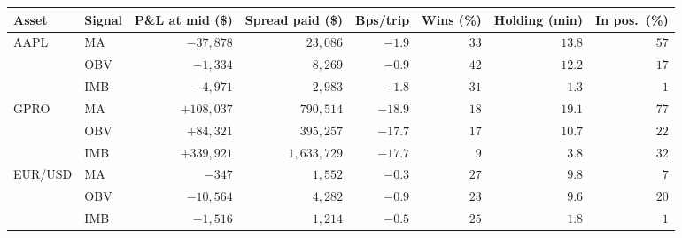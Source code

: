 \begin{tabular}{llrrrrrr}
\toprule
Asset & Signal & P\&L at mid (\$) & Spread paid (\$) & Bps/trip & Wins (\%) & Holding (min) & In pos.\ (\%) \\
\midrule
AAPL & MA & $-37{,}878$ & $23{,}086$ & $-1.9$ & $33$ & $13.8$ & $57$ \\
 & OBV & $-1{,}334$ & $8{,}269$ & $-0.9$ & $42$ & $12.2$ & $17$ \\
 & IMB & $-4{,}971$ & $2{,}983$ & $-1.8$ & $31$ & $1.3$ & $1$ \\
\midrule
GPRO & MA & $+108{,}037$ & $790{,}514$ & $-18.9$ & $18$ & $19.1$ & $77$ \\
 & OBV & $+84{,}321$ & $395{,}257$ & $-17.7$ & $17$ & $10.7$ & $22$ \\
 & IMB & $+339{,}921$ & $1{,}633{,}729$ & $-17.7$ & $9$ & $3.8$ & $32$ \\
\midrule
EUR/USD & MA & $-347$ & $1{,}552$ & $-0.3$ & $27$ & $9.8$ & $7$ \\
 & OBV & $-10{,}564$ & $4{,}282$ & $-0.9$ & $23$ & $9.6$ & $20$ \\
 & IMB & $-1{,}516$ & $1{,}214$ & $-0.5$ & $25$ & $1.8$ & $1$ \\
\bottomrule
\end{tabular}
